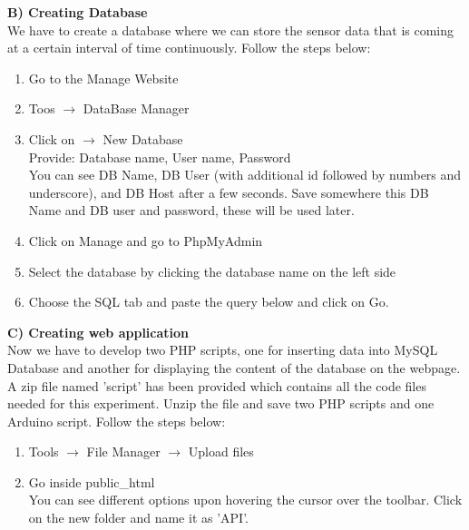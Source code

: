\documentclass[12pt,a4paper]{article}
\begin{document}
\begin{justify}
\noindent \textbf{B) Creating Database}\\[3pt]
We have to create a database where we can store the sensor data that is coming at a certain interval of time continuously. Follow the steps below:
\vspace{-3mm}
\begin{enumerate}
\setlength\itemsep{-0.3em}
\item Go to the Manage Website
\item Toos $ \rightarrow $  DataBase Manager
\item Click on $ \rightarrow $ New Database\\
Provide: Database name, User name, Password\\
You can see DB Name, DB User (with additional id followed by numbers and underscore), and DB Host after a few seconds. Save somewhere this DB Name and DB user and password, these will be used later.
\item Click on Manage and go to PhpMyAdmin
\item Select the database by clicking  the database name on the left side
\item Choose the SQL tab and paste the query below and click on Go.
\end{enumerate}





\noindent \textbf{C) Creating web application}\\[3pt]
Now we have to develop two PHP scripts, one for inserting data into MySQL Database and another for displaying the content of the database on the webpage. A zip file named 'script' has been provided which contains all the code files needed for this experiment. Unzip the file and save two PHP scripts and one Arduino script. Follow the steps below:
\vspace{-3mm}
\begin{enumerate}
\setlength\itemsep{-0.3em}
\item Tools $ \rightarrow $ File Manager $ \rightarrow $ Upload files
\item Go inside public\_html\\
You can see different options upon hovering the cursor over the toolbar. Click on the new folder and name it as 'API'.


\end{enumerate}
\end{justify}
\end{document}
